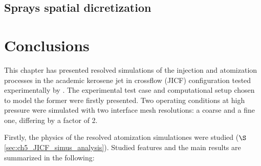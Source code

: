 \subsection{Sprays spatial dicretization}
\label{subsec:ch5_learning_SLI}




\clearpage


\section{Conclusions}

This chapter has presented resolved simulations of the injection and atomization processes in the academic kerosene jet in crossflow (JICF) configuration tested experimentally by . The experimental test case and computational setup chosen to model the former were firstly presented. Two operating conditions at high pressure were simulated with two interface mesh resolutions: a coarse and a fine one, differing by a factor of 2. 


Firstly, the physics of the resolved atomization simulationes were studied ($\S$\ref{sec:ch5_JICF_simus_analysis}). Studied features and the main results are summarized in the following:



